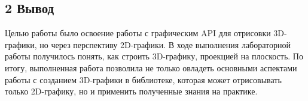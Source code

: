 \documentclass[12pt]{article}
\begin{document}
\subsection*{2 Вывод}

Целью работы было освоение работы с графическим API для отрисовки 3D-графики, но через перспективу 2D-графики.
В ходе выполнения лабораторной работы получилось понять, как строить 3D-графику, проекцией на плоскость. 
По итогу, выполненная работа позволила не только овладеть основными аспектами работы с созданием 3D-графики в библиотеке, которая может отрисовывать только 2D-графику, но и применить полученные знания на практике.
\end{document}
